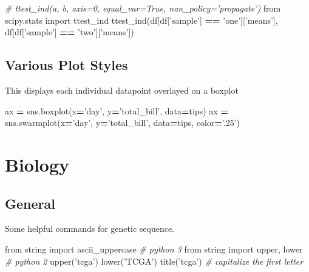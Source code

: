 \documentclass[]{book}
\newenvironment{Shaded}{\begin{snugshade}}{\end{snugshade}}
\newcommand{\CommentTok}[1]{\textcolor[rgb]{0.56,0.35,0.01}{\textit{#1}}}
\newcommand{\ImportTok}[1]{#1}
\newcommand{\NormalTok}[1]{#1}
\newcommand{\OperatorTok}[1]{\textcolor[rgb]{0.81,0.36,0.00}{\textbf{#1}}}
\newcommand{\StringTok}[1]{\textcolor[rgb]{0.31,0.60,0.02}{#1}}
\begin{document}
\begin{Shaded}
\begin{Highlighting}[]
\CommentTok{# ttest_ind(a, b, axis=0, equal_var=True, nan_policy='propagate')}
\ImportTok{from}\NormalTok{ scipy.stats }\ImportTok{import}\NormalTok{ ttest_ind}
\NormalTok{ttest_ind(df[df[}\StringTok{'sample'}\NormalTok{] }\OperatorTok{==} \StringTok{'one'}\NormalTok{][}\StringTok{'means'}\NormalTok{], df[df[}\StringTok{'sample'}\NormalTok{] }\OperatorTok{==} \StringTok{'two'}\NormalTok{][}\StringTok{'means'}\NormalTok{])}
\end{Highlighting}
\end{Shaded}

\hypertarget{various-plot-styles}{%
\section{Various Plot Styles}\label{various-plot-styles}}

This displays each individual datapoint overlayed on a boxplot

\begin{Shaded}
\begin{Highlighting}[]
\NormalTok{ax }\OperatorTok{=}\NormalTok{ sns.boxplot(x}\OperatorTok{=}\StringTok{'day'}\NormalTok{, y}\OperatorTok{=}\StringTok{'total_bill'}\NormalTok{, data}\OperatorTok{=}\NormalTok{tips)}
\NormalTok{ax }\OperatorTok{=}\NormalTok{ sns.swarmplot(x}\OperatorTok{=}\StringTok{'day'}\NormalTok{, y}\OperatorTok{=}\StringTok{'total_bill'}\NormalTok{, data}\OperatorTok{=}\NormalTok{tips, color}\OperatorTok{=}\StringTok{'.25'}\NormalTok{)}
\end{Highlighting}
\end{Shaded}

\hypertarget{biology}{%
\chapter{Biology}\label{biology}}

\hypertarget{general-1}{%
\section{General}\label{general-1}}

Some helpful commands for genetic sequence.

\begin{Shaded}
\begin{Highlighting}[]
\ImportTok{from}\NormalTok{ string }\ImportTok{import}\NormalTok{ ascii_uppercase }\CommentTok{# python 3}
\ImportTok{from}\NormalTok{ string }\ImportTok{import}\NormalTok{ upper, lower }\CommentTok{# python 2}
\NormalTok{upper(}\StringTok{'tcga'}\NormalTok{)}
\NormalTok{lower(}\StringTok{'TCGA'}\NormalTok{)}
\NormalTok{title(}\StringTok{'tcga'}\NormalTok{) }\CommentTok{# capitalize the first letter}
\end{Highlighting}
\end{Shaded}
\end{document}
